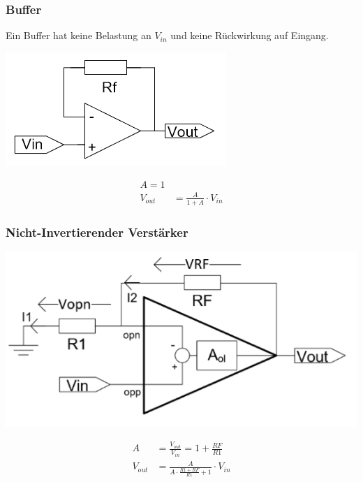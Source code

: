 \subsubsection{Buffer}
Ein Buffer hat keine Belastung an $V_{in}$ und keine Rückwirkung auf Eingang.\\
\begin{minipage}{0.25\textwidth}
	\includegraphics[width=\linewidth,keepaspectratio=true]{./Images/opamp_buffer}
\end{minipage}%
\begin{minipage}{0.25\textwidth}
	\begin{align*}
		A = 1\\
		V_{out} &= \frac{A}{1 + A}\cdot V_{in}
	\end{align*}
\end{minipage}

\subsubsection{Nicht-Invertierender Verstärker}
\begin{minipage}{0.25\textwidth}
	\includegraphics[width=\linewidth,keepaspectratio=true]{./Images/opamp_negatives_feedback}
\end{minipage}%
\begin{minipage}{0.25\textwidth}
	\begin{align*}
		A &= \frac{V_{out}}{V_{in}} = 1 + \frac{RF}{R1} \\
		V_{out} &= \frac{A}{A \cdot \frac{R1 + RF}{R1} + 1} \cdot V_{in}
	\end{align*}
\end{minipage}

